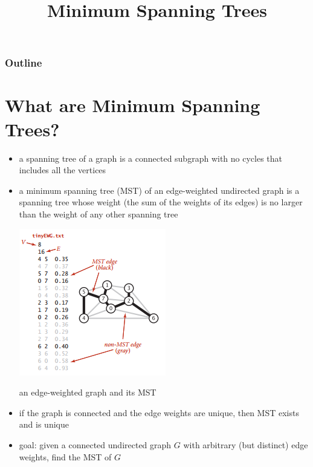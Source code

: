 \documentclass[8pt,a4paper,compress]{beamer}
\title{Minimum Spanning Trees}
\date{}
\begin{document}
\begin{frame}
\vfill
\titlepage
\end{frame}

\begin{frame}
\frametitle{Outline}
\tableofcontents
\end{frame}

\section{What are Minimum Spanning Trees?}
\begin{frame}[fragile]
\begin{itemize}
\item a spanning tree of a graph is a connected subgraph with no cycles that includes all the vertices

\item a minimum spanning tree (MST) of an edge-weighted undirected graph is a spanning tree whose weight (the sum of the weights of its edges) is no larger than the weight of any other spanning tree

\begin{center}
\includegraphics[scale=0.4]{./figures/mst1.png}

\smallskip

\tiny an edge-weighted graph and its MST
\end{center}

\item if the graph is connected and the edge weights are unique, then MST exists and is unique

\item goal: given a connected undirected graph $G$ with arbitrary (but distinct) edge weights, find the MST of $G$
\end{itemize}
\end{frame}
\end{document}
